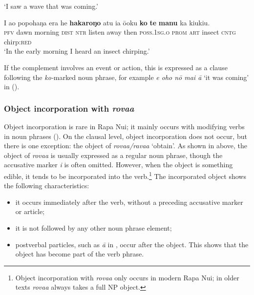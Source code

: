 \glt 
‘I saw a wave that was coming.’ \textstyleExampleref{[R406.040]} 
\z

\ea\label{ex:8.152}
\gll I {\ꞌ}ao popohaŋa era he \textbf{hakaroŋo} atu ia ō{\ꞌ}oku \textbf{ko} \textbf{te} \textbf{manu} ka kiukiu.\\
\textsc{pfv} dawn morning \textsc{dist} \textsc{ntr} listen away then \textsc{poss.1sg.o} \textsc{prom} \textsc{art} insect \textsc{cntg} chirp:\textsc{red}\\

\glt
‘In the early morning I heard an insect chirping.’ \textstyleExampleref{[R109.005]} 
\z

If the complement involves an event or action, this is expressed as a clause following the \textit{ko-}marked noun phrase, for example \textit{e oho nō mai {\ꞌ}ā} ‘it was coming’ in  ().

\subsubsection[Object incorporation with rova{\ꞌ}a]{Object incorporation with \textit{rova{\ꞌ}a}}\label{sec:8.6.4.6}
Object incorporation is rare in Rapa Nui; it mainly occurs with modifying verbs in noun phrases (). On the clausal level, object incorporation does not occur, but there is one exception: the object of \textit{rova{\ꞌ}a/rava{\ꞌ}a} ‘obtain’. As shown in  above, the object of \textit{rova{\ꞌ}a} is usually expressed as a regular noun phrase, though the accusative marker \textit{i} is often omitted. However, when the object is something edible, it tends to be incorporated into the verb.\footnote{\label{fn:444}Object incorporation with \textit{rova{\ꞌ}a} only occurs in modern Rapa Nui; in older texts \textit{rova{\ꞌ}a} always takes a full NP object.} The incorporated object shows the following characteristics:

\begin{itemize}
\item 
it occurs immediately after the verb, without a preceding accusative marker or article; 

\item 
it is not followed by any other noun phrase element;

\item 
postverbal particles, such as \textit{{\ꞌ}ā} in , occur after the object. This shows that the object has become part of the verb phrase.

\end{itemize}

